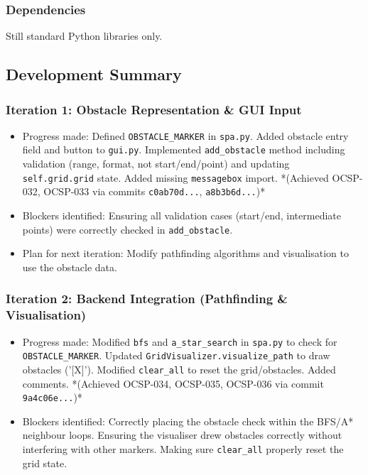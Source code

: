 \subsubsection{Dependencies}
Still standard Python libraries only.

\newpage
\subsection{Development Summary}

\subsubsection{Iteration 1: Obstacle Representation \& GUI Input}
\begin{itemize}
	\item Progress made: Defined \verb|OBSTACLE_MARKER| in \verb|spa.py|. Added obstacle entry field and button to \verb|gui.py|. Implemented \verb|add_obstacle| method including validation (range, format, not start/end/point) and updating \verb|self.grid.grid| state. Added missing \verb|messagebox| import. *(Achieved OCSP-032, OCSP-033 via commits \verb|c0ab70d...|, \verb|a8b3b6d...|)*
	\item Blockers identified: Ensuring all validation cases (start/end, intermediate points) were correctly checked in \verb|add_obstacle|.
	\item Plan for next iteration: Modify pathfinding algorithms and visualisation to use the obstacle data.
\end{itemize}

\subsubsection{Iteration 2: Backend Integration (Pathfinding \& Visualisation)}
\begin{itemize}
	\item Progress made: Modified \verb|bfs| and \verb|a_star_search| in \verb|spa.py| to check for \verb|OBSTACLE_MARKER|. Updated \verb|GridVisualizer.visualize_path| to draw obstacles ('[X]'). Modified \verb|clear_all| to reset the grid/obstacles. Added comments. *(Achieved OCSP-034, OCSP-035, OCSP-036 via commit \verb|9a4c06e...|)*
	\item Blockers identified: Correctly placing the obstacle check within the BFS/A* neighbour loops. Ensuring the visualiser drew obstacles correctly without interfering with other markers. Making sure \verb|clear_all| properly reset the grid state.
\end{itemize}

